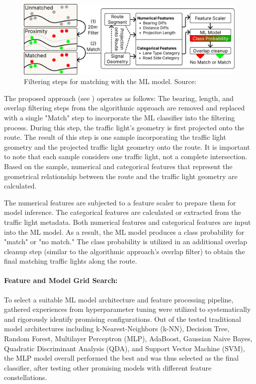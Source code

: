 \begin{figure}[t]
\centering
\includegraphics[width=\linewidth]{images/sg-matching-ml-model.pdf}
\caption{Filtering steps for matching with the ML model. Source: \cite{matthes2023geo}}
\label{fig:sg-matching-ml-model}
\end{figure}

The proposed approach (see ) operates as follows: The bearing, length, and overlap filtering steps from the algorithmic approach are removed and replaced with a single "Match" step to incorporate the ML classifier into the filtering process. During this step, the traffic light's geometry is first projected onto the route. The result of this step is one sample incorporating the traffic light geometry and the projected traffic light geometry onto the route. It is important to note that each sample considers one traffic light, not a complete intersection. Based on the sample, numerical and categorical features that represent the geometrical relationship between the route and the traffic light geometry are calculated.

The numerical features are subjected to a feature scaler to prepare them for model inference. The categorical features are calculated or extracted from the traffic light metadata. Both numerical features and categorical features are input into the ML model. As a result, the ML model produces a class probability for "match" or "no match." The class probability is utilized in an additional overlap cleanup step (similar to the algorithmic approach's overlap filter) to obtain the final matching traffic lights along the route.

\paragraph{Feature and Model Grid Search:} To select a suitable ML model architecture and feature processing pipeline, gathered experiences from hyperparameter tuning were utilized to systematically and rigorously identify promising configurations. Out of the tested traditional model architectures including k-Nearest-Neighbors (k-NN), Decision Tree, Random Forest, Multilayer Perceptron (MLP), AdaBoost, Gaussian Naive Bayes, Quadratic Discriminant Analysis (QDA), and Support Vector Machine (SVM), the MLP model overall performed the best and was thus selected as the final classifier, after testing other promising models with different feature constellations. 


